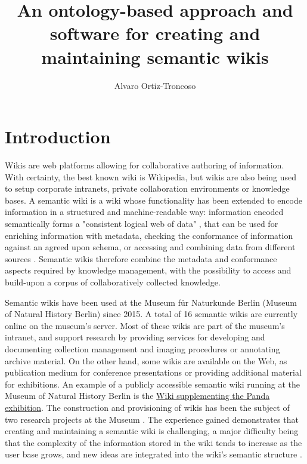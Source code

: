 \documentclass[fleqn,10pt,lineno]{wlpeerj} %
\title{An ontology-based approach and software for creating and maintaining semantic wikis}
\author[1]{Alvaro Ortiz-Troncoso}
\affil[1]{Museum für Naturkunde - Leibniz Institute for Research on Evolution and Biodiversity}
\begin{document}
\flushbottom
\maketitle
\thispagestyle{empty}

\section{Introduction}
Wikis are web platforms allowing for collaborative authoring of information. With certainty, the best known wiki is Wikipedia, but wikis are also being used to setup corporate intranets, private collaboration environments or knowledge bases. A semantic wiki is a wiki whose functionality has been extended to encode information in a structured and machine-readable way: information encoded semantically forms a "consistent logical web of data" \citep{berners1998semantic}, that can be used for enriching information with metadata, checking the conformance of information against an agreed upon schema, or accessing and combining data from different sources \citep{oren2006semantic}. Semantic wikis therefore combine the metadata and conformance aspects required by knowledge management, with the possibility to access and build-upon a corpus of collaboratively collected knowledge. 

Semantic wikis have been used at the Museum für Naturkunde Berlin (Museum of Natural History Berlin) since 2015. A total of 16 semantic wikis are currently online on the museum's server. Most of these wikis are part of the museum's intranet, and support research by providing services for developing and documenting collection management and imaging procedures or annotating archive material. On the other hand, some wikis are available on the Web, as publication medium for conference presentations or providing additional material for exhibitions. An example of a publicly accessible semantic wiki running at the Museum of Natural History Berlin is the \href{http://biowikifarm.net/v-mfn/panda_en/index.php}{Wiki supplementing the Panda exhibition}. The construction and provisioning of wikis has been the subject of two research projects at the Museum \citep{patzschke2016}. The experience gained demonstrates that creating and maintaining a semantic wiki is challenging, a major difficulty being that the complexity of the information stored in the wiki tends to increase as the user base grows, and new ideas are integrated into the wiki's semantic structure \citep{kiniti2013wikis}.
\end{document}

